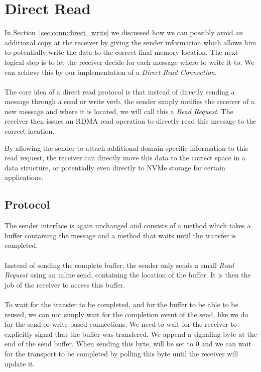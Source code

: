 
\section{Direct Read} \label{sec:conn:direct_read}

In Section~\ref{sec:conn:direct_write} we discussed how we can possibly avoid an additional copy at the receiver by giving 
the sender information which allows him to potentially write the data to the correct final memory location. The next logical
step is to let the receiver decide for each message where to write it to. We can achieve this by our implementation of a
\emph{Direct Read Connection}.

\paragraph{} The core idea of a direct read protocol is that instead of directly sending a message through a send or write 
verb, the sender simply notifies the receiver of a new message and where it is located, we will call this a \emph{Read Request}.
The receiver then issues an RDMA read operation to directly read this message to the correct location.

By allowing the sender to attach additional domain specific information to this read request, the receiver can directly 
move this data to the correct space in a data structure, or potentially even directly to NVMe storage for certain applications.


\subsection{Protocol}
The sender interface is again unchanged and consists of a  method which takes a buffer containing the
message and a  method that waits until the transfer is completed.

\paragraph{} Instead of sending the complete buffer, the sender only sends a small \emph{Read Request} using an inline send,
containing the location of the buffer. It is then the job of the receiver to access this buffer.

\paragraph{} To wait for the transfer to be completed, and for the buffer to be able to be reused, we can not simply wait 
for the completion event of the send, like we do for the send or write based connections. We need to wait for the receiver 
to explicitly signal that the buffer was transfered. We append a signaling byte at the end of the send buffer. 
When sending this byte, will be set to 0 and we can wait for the transport to be completed by polling this byte until the 
receiver will update it.

